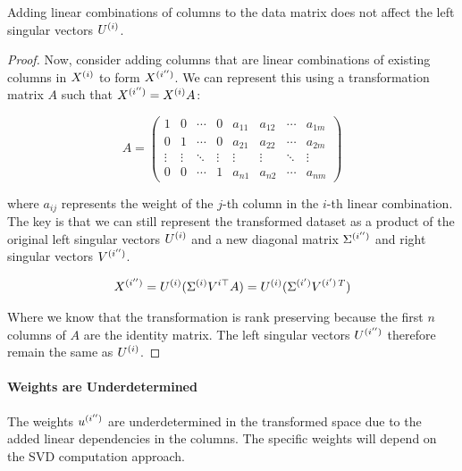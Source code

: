 \begin{lemma}
    Adding linear combinations of columns to the data matrix does not affect the left singular vectors $U^{(i)}$.
\end{lemma}

\begin{proof}
    Now, consider adding columns that are linear combinations of existing columns in \( X^{(i)} \) to form \( X^{(i'')} \).
    We can represent this using a transformation matrix \( A \) such that \( X^{(i'')} = X^{(i)}A \):

    \begin{equation}
        A = \begin{pmatrix}
                1      & 0      & \cdots & 0      & a_{11} & a_{12} & \cdots & a_{1m} \\
                0      & 1      & \cdots & 0      & a_{21} & a_{22} & \cdots & a_{2m} \\
                \vdots & \vdots & \ddots & \vdots & \vdots & \vdots & \ddots & \vdots \\
                0      & 0      & \cdots & 1      & a_{n1} & a_{n2} & \cdots & a_{nm}
        \end{pmatrix}
    \end{equation}

    where \( a_{ij} \) represents the weight of the \( j \)-th column in the \( i \)-th linear combination.
    The key is that we can still represent the transformed dataset as a product of the original left singular vectors \( U^{(i)} \) and a new diagonal matrix \( \Sigma^{(i'')} \) and right singular vectors \( V^{(i'')} \).

    \begin{align}
        X^{(i'')} = U^{(i)}(\Sigma^{(i)}V^{i\top}A) = U^{(i)}(\Sigma^{(i')}V^{(i')\,T})  \label{eq:svd_linear_combinations}
    \end{align}

    Where we know that the transformation is rank preserving because the first \( n \) columns of \( A \) are the identity matrix.
    The left singular vectors \( U^{(i'')} \) therefore remain the same as \( U^{(i)} \).
\end{proof}

\paragraph{Weights are Underdetermined}
The weights \( u^{(i'')} \) are underdetermined in the transformed space due to the added linear dependencies in the columns. The specific weights will depend on the SVD computation approach.

